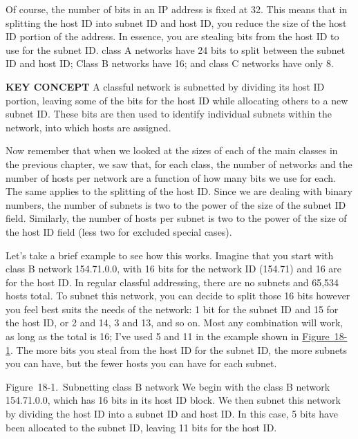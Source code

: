 Of course, the number of bits in an IP address is fixed at 32. This
means that in splitting the host ID into subnet ID and host ID, you
reduce the size of the host ID portion of the address. In essence, you
are stealing bits from the host ID to use for the subnet ID. class A
networks have 24 bits to split between the subnet ID and host ID; Class
B networks have 16; and class C networks have only 8.


{\textbf{KEY CONCEPT}} A classful network is subnetted by dividing its
host ID portion, leaving some of the bits for the host ID while
allocating others to a new subnet ID. These bits are then used to
identify individual subnets within the network, into which hosts are
assigned.

Now remember that when we looked at the sizes of each of the main
classes in the previous chapter, we saw that, for each class, the number
of networks and the number of hosts per network are a function of how
many bits we use for each. The same applies to the splitting of the host
ID. Since we are dealing with binary numbers, the number of subnets is
two to the power of the size of the subnet ID field. Similarly, the
number of hosts per subnet is two to the power of the size of the host
ID field (less two for excluded special cases).

Let's take a brief example to see how this works. Imagine that you start
with class B network 154.71.0.0, with 16 bits for the network ID
(154.71) and 16 are for the host ID. In regular classful addressing,
there are no subnets and 65,534 hosts total. To subnet this network, you
can decide to split those 16 bits however you feel best suits the needs
of the network: 1 bit for the subnet ID and 15 for the host ID, or 2 and
14, 3 and 13, and so on. Most any combination will work, as long as the
total is 16; I've used 5 and 11 in the example shown in
\protect\hyperlink{ch18s02.htmlux5cux23subnetting_class_b_network_we_begin_with}{Figure~18-1}.
The more bits you steal from the host ID for the subnet ID, the more
subnets you can have, but the fewer hosts you can have for each subnet.





Figure~18-1.~Subnetting class B network We begin with the class B
network 154.71.0.0, which has 16 bits in its host ID block. We then
subnet this network by dividing the host ID into a subnet ID and host
ID. In this case, 5 bits have been allocated to the subnet ID, leaving
11 bits for the host ID.

